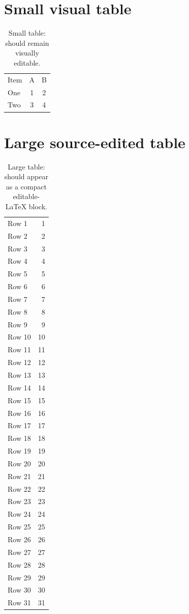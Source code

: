 \documentclass{article}
\begin{document}
\section{Small visual table}

\begin{table}[htbp]
\centering
\begin{tabular}{lcc}
Item & A & B \\
One & 1 & 2 \\
Two & 3 & 4 \\
\end{tabular}
\caption{Small table: should remain visually editable.}
\label{tab:small}
\end{table}

\section{Large source-edited table}

\begin{table}[htbp]
\centering
\begin{tabular}{lr}
Row 1 & 1 \\
Row 2 & 2 \\
Row 3 & 3 \\
Row 4 & 4 \\
Row 5 & 5 \\
Row 6 & 6 \\
Row 7 & 7 \\
Row 8 & 8 \\
Row 9 & 9 \\
Row 10 & 10 \\
Row 11 & 11 \\
Row 12 & 12 \\
Row 13 & 13 \\
Row 14 & 14 \\
Row 15 & 15 \\
Row 16 & 16 \\
Row 17 & 17 \\
Row 18 & 18 \\
Row 19 & 19 \\
Row 20 & 20 \\
Row 21 & 21 \\
Row 22 & 22 \\
Row 23 & 23 \\
Row 24 & 24 \\
Row 25 & 25 \\
Row 26 & 26 \\
Row 27 & 27 \\
Row 28 & 28 \\
Row 29 & 29 \\
Row 30 & 30 \\
Row 31 & 31 \\
\end{tabular}
\caption{Large table: should appear as a compact editable-LaTeX block.}
\label{tab:large}
\end{table}
\end{document}
